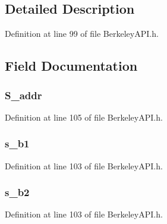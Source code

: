 \subsection{Detailed Description}


Definition at line 99 of file Berkeley\+A\+P\+I.\+h.



\subsection{Field Documentation}
\hypertarget{structin__addr_aacb515a04e3508f1673b2c10b45df134}{}
\subsubsection[{S\+\_\+addr}]{ S\+\_\+addr}\label{structin__addr_aacb515a04e3508f1673b2c10b45df134}


Definition at line 105 of file Berkeley\+A\+P\+I.\+h.

\hypertarget{structin__addr_ab8d7c45a86d97a372ccb41d6618f46f3}{}
\subsubsection[{s\+\_\+b1}]{ s\+\_\+b1}\label{structin__addr_ab8d7c45a86d97a372ccb41d6618f46f3}


Definition at line 103 of file Berkeley\+A\+P\+I.\+h.

\hypertarget{structin__addr_a9606af179c8295653be9a1e255f5ca24}{}
\subsubsection[{s\+\_\+b2}]{ s\+\_\+b2}\label{structin__addr_a9606af179c8295653be9a1e255f5ca24}


Definition at line 103 of file Berkeley\+A\+P\+I.\+h.

\hypertarget{structin__addr_af872852810d110496eeac3ca566bc153}{}
